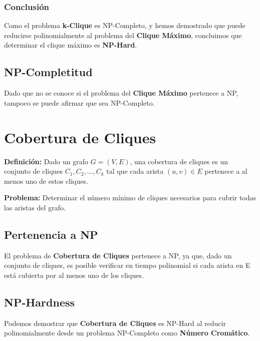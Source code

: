 \documentclass[a4paper,12pt]{article}
\begin{document}
\subsubsection{Conclusi\'on}
Como el problema \textbf{k-Clique} es NP-Completo, y hemos demostrado que puede reducirse polinomialmente al problema del \textbf{Clique M\'aximo}, concluimos que determinar el clique m\'aximo es \textbf{NP-Hard}.

\subsection{NP-Completitud}

Dado que no se conoce si el problema del \textbf{Clique M\'aximo} pertenece a NP, tampoco se puede afirmar que sea NP-Completo.



\section{Cobertura de Cliques}


\textbf{Definici\'on:} Dado un grafo $G = (V, E)$, una cobertura de cliques es un conjunto de cliques $C_1, C_2, \dots, C_k$ tal que cada arista $(u, v) \in E$ pertenece a al menos uno de estos cliques.

\textbf{Problema:} Determinar el n\'umero m\'inimo de cliques necesarios para cubrir todas las aristas del grafo.

\subsection{Pertenencia a NP}

El problema de \textbf{Cobertura de Cliques} pertenece a NP, ya que, dado un conjunto de cliques, es posible verificar en tiempo polinomial si cada arista en E está cubierta por
al menos uno de los cliques. 



\subsection{NP-Hardness}

Podemos demostrar que \textbf{Cobertura de Cliques} es NP-Hard al reducir polinomialmente desde un problema NP-Completo como \textbf{N\'umero Crom\'atico}.
\end{document}
